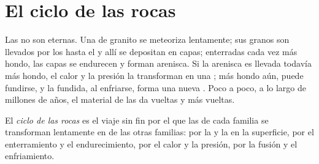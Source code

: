 \section{El ciclo de las rocas}

Las  no son eternas. Una  de granito se meteoriza lentamente;
sus granos son llevados por los  hasta el  y allí se depositan en
capas; enterradas cada vez más hondo, las capas se endurecen y forman
arenisca. Si la arenisca es llevada todavía más hondo, el calor y la
presión la transforman en una ; más hondo aún, puede
fundirse, y la  fundida, al enfriarse, forma una nueva . Poco
a poco, a lo largo de millones de años, el material de las  da vueltas
y más vueltas.

\begin{definition}\label{def:g6:rocks-and-minerals:rock-cycle}
El \emph{ciclo de las rocas} es el viaje sin fin
por el que las  de cada familia se transforman lentamente en  de
las otras familias: por la  y la  en la superficie, por
el enterramiento y el endurecimiento, por el calor y la presión, por la
fusión y el enfriamiento.
\end{definition}

